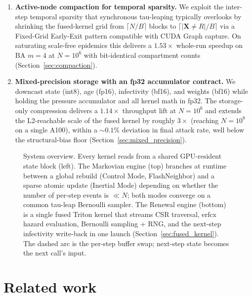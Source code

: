 \documentclass[a4paper,fleqn]{cas-sc}
\theoremstyle{definition}
\theoremstyle{remark}
\begin{document}
\begin{enumerate}
    \item \textbf{Active-node compaction for temporal sparsity.} We exploit the inter-step temporal sparsity that synchronous tau-leaping typically overlooks by shrinking the fused-kernel grid from $\lceil N/B \rceil$ blocks to $\lceil |\mathbf{X} {\ne} R| / B \rceil$ via a Fixed-Grid Early-Exit pattern compatible with CUDA Graph capture. On saturating scale-free epidemics this delivers a $\mathbf{1.53\times}$ whole-run speedup on BA $m{=}4$ at $N{=}10^6$ with bit-identical compartment counts (Section~\ref{sec:compaction}).

    \item \textbf{Mixed-precision storage with an fp32 accumulator contract.} We downcast state (int8), age (fp16), infectivity (bf16), and weights (bf16) while holding the pressure accumulator and all kernel math in fp32. The storage-only compression delivers a $1.14\times$ throughput lift at $N = 10^6$ and extends the L2-reachable scale of the fused kernel by roughly $3\times$ (reaching $N = 10^8$ on a single A100), within a $\sim\!0.1\%$ deviation in final attack rate, well below the structural-bias floor (Section~\ref{sec:mixed_precision}).
\end{enumerate}

\begin{figure}[!t]
\centering

\caption{System overview. Every kernel reads from a shared GPU-resident state block (left). The Markovian engine (top) branches at runtime between a global rebuild (Control Mode, FlashNeighbor) and a sparse atomic update (Inertial Mode) depending on whether the number of per-step events is $\ll N$; both modes converge on a common tau-leap Bernoulli sampler. The Renewal engine (bottom) is a single fused Triton kernel that streams CSR traversal, $\mathrm{erfcx}$ hazard evaluation, Bernoulli sampling + RNG, and the next-step infectivity write-back in one launch (Section~\ref{sec:fused_kernel}). The dashed arc is the per-step buffer swap; next-step state becomes the next call's input.}
\label{fig:architecture}
\end{figure}

\section{Related work}\label{sec:related}
\end{document}
